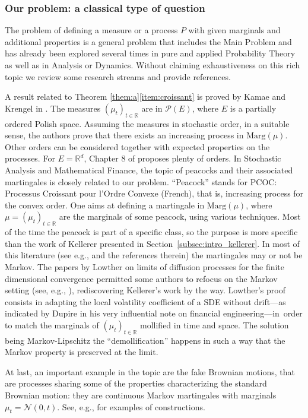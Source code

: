 \documentclass[JEP,XML,SOM,Unicode,NoEqCountersInSection,NoFloatCountersInSection,published]{cedram}
\theoremstyle{plain}
\theoremstyle{definition}
\newcommand{\p}{\mathcal{P}}
\newcommand{\ma}{\mathrm{Marg}}
\newcommand{\R}{\mathbb{R}}
\begin{document}
\subsubsection*{Our problem: a classical type of question} The problem of defining a measure or a process $P$ with given marginals and additional properties is a general problem that includes the Main Problem and has already been explored several times in pure and applied Probability Theory as well as in Analysis or Dynamics. Without claiming exhaustiveness on this rich topic we review some research streams and provide references.

A result related to Theorem \ref{them:a}\eqref{item:croissant} is proved by Kamae and Krengel in \cite{KaKr}. The measures $(\mu_t)_{t\in \R}$ are in $\p(E)$, where $E$ is a partially ordered Polish space. Assuming the measures in stochastic order, in a suitable sense, the authors prove that there exists an increasing process in $\ma(\mu)$. Other orders can be considered together with expected properties on the processes. For $E=\R^d$, Chapter 8 of \cite{SS} proposes plenty of orders. In Stochastic Analysis and Mathematical Finance, the topic of peacocks and their associated martingales is closely related to our problem. ``Peacock'' stands for PCOC: Processus Croissant pour l'Ordre Convexe (French), that is, increasing process for the convex order. One aims at defining a martingale in $\ma(\mu)$, where $\mu=(\mu_t)_{t\in \R}$ are the marginals of some peacock, using various techniques. Most of the time the peacock is part of a specific class, so the purpose is more specific than the work of Kellerer presented in Section~\ref{subsec:intro_kellerer}. In most of this literature (see e.g., \cite{Gy,Dupire,BrSh,MaYo02,Ju_ejp,HTT,HiRo13,Hob16,pages} and the references therein) the martingales may or not be Markov. The papers by Lowther \cite{Low,Low2} on limits of diffusion processes for the finite dimensional convergence permitted some authors to refocus on the Markov setting (see, e.g., \cite{BHS,HiRoYo14,Ju_seminaire}), rediscovering Kellerer's work by the way. Lowther's proof consists in adapting the local volatility coefficient of a SDE without drift---as indicated by Dupire in his very influential note \cite{Dupire} on financial engineering---in~order to match the marginals of $(\mu_t)_{t\in \R}$ mollified in time and space. The solution being Markov-Lipschitz the ``demollification'' happens in such a way that the Markov property is preserved at the limit.

At last, an important example in the topic are the fake Brownian motions, that are processes sharing some of the properties characterizing the standard Brownian motion: they are continuous Markov martingales with marginals $\mu_t=\mathcal{N}(0,t)$. See, e.g., \cite{MaYo02,HaKl,Albin,Ol,Hob_fake,HTT} for examples of constructions.
\end{document}
